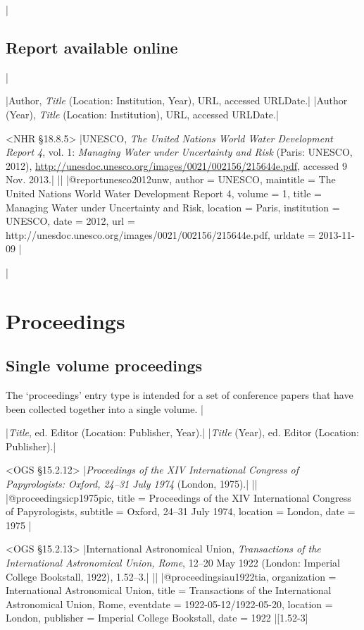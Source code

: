 \documentclass[extrafontsizes,11pt,a4paper,oneside]{memoir}
\newcommand*{\lit}[1]{\textsf{#1}}
\newcommand*{\code}[1]{`\textsf{#1}'}
\begin{document}
\todoc|
\section{Report available online}
|

\specs
|Author, \emph{Title} (Location: Institution, Year), URL, \lit{accessed} URLDate.|%
|Author (Year), \emph{Title} (Location: Institution), URL, \lit{accessed} URLDate.|

\bibexample<NHR \S18.8.5>
|UNESCO, \emph{The United Nations World Water Development Report 4}, vol. 1: \emph{Managing Water under Uncertainty and Risk} (Paris: UNESCO, 2012), \url{http://unesdoc.unesco.org/images/0021/002156/215644e.pdf}, accessed 9 Nov. 2013.|%
||%
|@report{unesco2012unw,
  author = {UNESCO},
  maintitle = {The United Nations World Water Development Report 4},
  volume = {1},
  title = {Managing Water under Uncertainty and Risk},
  location = {Paris},
  institution = {UNESCO},
  date = {2012},
  url = {http://unesdoc.unesco.org/images/0021/002156/215644e.pdf},
  urldate = {2013-11-09}
}|

\todoc|
\chapter{Proceedings}\label{sec:proceedings}

\section{Single volume proceedings}

The \code{proceedings} entry type is intended for a set of conference papers that have been collected together into a single volume.
|

\specs
|\emph{Title}, \lit{ed.} Editor (Location: Publisher, Year).|%
|\emph{Title} (Year), \lit{ed.} Editor (Location: Publisher).|

\bibexample<OGS \S15.2.12>
|\emph{Proceedings of the XIV International Congress of Papyrologists: Oxford, 24--31 July 1974} (London, 1975).|%
||%
|@proceedings{icp1975pic,
  title = {Proceedings of the {XIV} {International} {Congress} of {Papyrologists}},
  subtitle = {{Oxford}, 24--31 {July} 1974},
  location = {London},
  date = {1975}
}|

\bibexample<OGS \S15.2.13>
|International Astronomical Union, \emph{Transactions of the International Astronomical Union, Rome}, 12--20 May 1922 (London: Imperial College Bookstall, 1922), 1.52–3.|%
||%
|@proceedings{iau1922tia,
  organization = {International Astronomical Union},
  title = {Transactions of the {International} {Astronomical} {Union}, {Rome}},
  eventdate = {1922-05-12/1922-05-20},
  location = {London},
  publisher = {Imperial College Bookstall},
  date = {1922}
}|[1.52-3]
\end{document}
